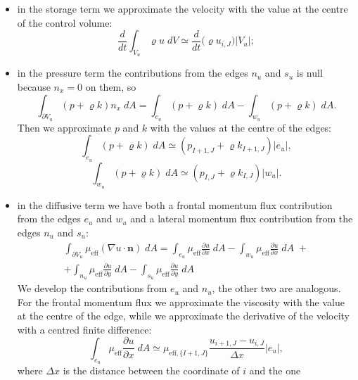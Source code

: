 \begin{itemize}
	\item in the storage term we approximate the velocity with the value at the 
	centre of the control volume:
	\begin{equation}
	\frac{d}{dt} \int_{V_u} \varrho u\; dV \simeq \frac{d}{dt} \big( \varrho 
	u_{i,J} \big)|V_u|;
	\end{equation}
	\item in the pressure term the contributions from the edges $n_u$ and $s_u$ 
	is null because $n_x=0$ on them, so 
	\begin{equation}
	\int_{\partial V_u} (p + \varrho k)n_x \; dA = \int_{e_u} (p+\varrho k) \; 
	dA - \int_{w_u} (p+\varrho k) \; dA.
	\end{equation}
	Then we approximate $p$ and $k$ with the values at the centre of the edges:
	\begin{equation}
	\int_{e_u} (p+\varrho k) \; dA \simeq (p_{I+1,J} +\varrho k_{I+1,J}) |e_u|,
	\end{equation}
	\begin{equation}
	\int_{w_u} (p+\varrho k) \; dA \simeq (p_{I,J} +\varrho k_{I,J}) |w_u|.
	\end{equation}
	\item in the diffusive term we have both a frontal momentum flux 
	contribution from the edges $e_u$ and $w_u$ and a lateral momentum flux 
	contribution from the edges $n_u$ and $s_u$:
	\begin{multline}
	\int_{\partial V_u} \mu_\text{eff} (\nabla u \cdot \mathbf{n}) \; dA =     
	\int_{e_u} \mu_\text{eff} \frac{\partial u}{\partial x} \; dA
	- \int_{w_u} \mu_\text{eff} \frac{\partial u}{\partial x} \; dA \;+\\
	+\int_{n_u} \mu_\text{eff} \frac{\partial u}{\partial y} \; dA
	- \int_{s_u} \mu_\text{eff} \frac{\partial u}{\partial y} \; dA
	\end{multline}
	We develop the contributions from $e_u$ and $n_u$, the other two are 
	analogous.\\	
	For the frontal momentum flux we approximate the viscosity with 
	the value at the centre of the edge, while we approximate the derivative of 
	the velocity with a centred finite difference:
	\begin{equation}
	\int_{e_u} \mu_\text{eff} \frac{\partial u}{\partial x} \; dA \simeq 
	\mu_{\text{eff},\{I+1,J\}} \frac{u_{i+1,J} - u_{i,J}}{\Delta x} |e_u|,
	\end{equation}
	where $\Delta x$ is the distance between the coordinate of $i$ and the one 

\end{itemize}
